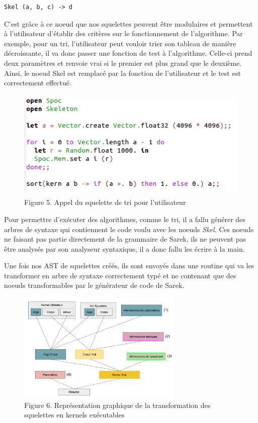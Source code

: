 \documentclass{report}
\begin{document}
\begin{lstlisting}
Skel (a, b, c) -> d
\end{lstlisting}

C'est grâce à ce noeud que nos squelettes peuvent être modulaires et permettent à l'utilisateur d'établir des critères sur le fonctionnement de l'algorithme. Par exemple, pour un tri, l'utilisateur peut vouloir trier son tableau de manière décroissante, il va donc passer une fonction de test à l'algorithme. Celle-ci prend deux paramètres et renvoie vrai si le premier est plus grand que le deuxième. Ainsi, le noeud Skel est remplacé par la fonction de l'utilisateur et le test est correctement effectué. 

\begin{figure}[!h]
\begin{center}
\includegraphics[height=150pt]{images_finales/sort.png}
\end{center}
\caption{Figure 5. Appel du squelette de tri pour l'utilisateur}
\label{test5}
\end{figure}

Pour permettre d'exécuter des algorithmes, comme le tri, il a fallu générer des arbres de syntaxe qui contiennent le code voulu avec les noeuds \textit{Skel}. Ces noeuds ne faisant pas partie directement de la grammaire de Sarek, ils ne peuvent pas être analysés par son analyseur syntaxique, il a donc fallu les écrire à la main. \newline

Une fois nos AST de squelettes créés, ils sont envoyés dans une routine qui va les transformer en arbre de syntaxe correctement typé et ne contenant que des noeuds transformables par le générateur de code de Sarek.\newline

\begin{figure}[!h]
\begin{center}
\includegraphics[height=150pt]{images_finales/fonctionnement_skel.png}
\end{center}
\caption{Figure 6. Représentation graphique de la transformation des squelettes en kernels exécutables}
\label{test6}
\end{figure}
\end{document}
